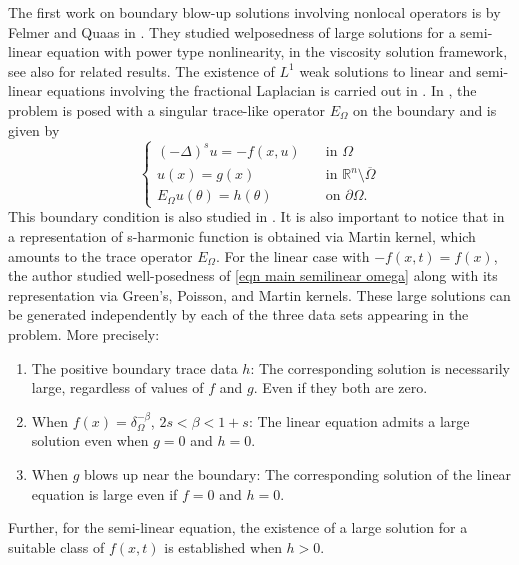 \documentclass{amsart}
\newcommand{\R}{\mathbb{R}}
\newcommand{\slap}{(-\Delta)^{s}}
\begin{document}
The first work on boundary blow-up solutions involving nonlocal operators is by Felmer and Quaas in \cite{FelmerQuass2012}. They studied welposedness of large solutions for a semi-linear equation with power type nonlinearity, in the viscosity solution framework, see also \cite{ChenFelmerQuass2015} for related results.
The existence of $L^{1}$ weak solutions to linear and semi-linear equations involving the fractional Laplacian is carried out in \cite{Abatangelo2015LargesHarmonic}. In \cite{Abatangelo2015LargesHarmonic}, the problem is posed with a singular trace-like operator $E_{\Omega}$ on the boundary and is given by
\begin{equation}\label{eqn main semilinear omega}
\begin{cases}
\slap u=-f(x,u) \quad &\text{in }\Omega\\
u(x)=g(x) &\text{in }\R^{n}\setminus\overline{\Omega}\\
E_{\Omega}u(\theta)=h(\theta) &\text{on }\partial\Omega.
\end{cases}
\end{equation} 
This boundary condition is also studied in \cite{Grubb2014}. It is also important to notice that in \cite{BogdanKulczyckiMateusz2008} a representation of s-harmonic function is obtained via Martin kernel, which amounts to the trace operator $E_{\Omega}$. For the linear case with $-f(x,t)=f(x)$, the author \cite{Abatangelo2015LargesHarmonic} studied well-posedness of \eqref{eqn main semilinear omega} along with its representation via Green's, Poisson, and Martin kernels. These large solutions can be generated independently by each of the three data sets appearing in the problem. More precisely:


\begin{enumerate}
    \item[--] The positive boundary trace data $h$: The corresponding solution is necessarily large, regardless of values of $f$ and $g$. Even if they both are zero.
    \item[--] When $f(x)=\delta_{\Omega}^{-\beta}$, $2s<\beta<1+s$: The linear equation admits a large solution even when $g=0$ and $h=0$.
    \item[--] When $g$ blows up near the boundary: The corresponding solution of the linear equation is large even if $f=0$ and $h=0$.
\end{enumerate}
 Further, for the semi-linear equation, the existence of a large solution for a suitable class of $f(x,t)$ is established when $h>0$.
\end{document}
